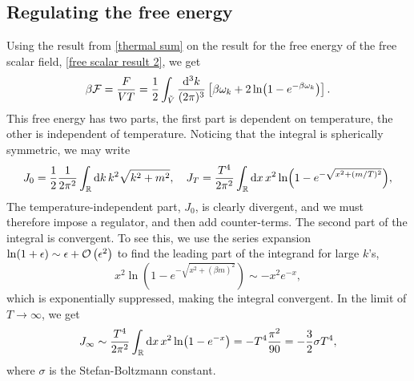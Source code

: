 \subsection{Regulating the free energy}
Using the result from \autoref{thermal sum} on the result for the free energy of the free scalar field, \autoref{free scalar result 2}, we get
\begin{equation}
    \label{free scalar free enrgy}
    \beta \mathcal{F} = \frac{F}{VT}
    = \frac{1}{2} \int_{\tilde V} \frac{\dd^3 k}{(2 \pi)^3}
    \left[
        \beta \omega_k + 2\ln(1 - e^{-\beta\omega_k})
    \right].
\end{equation}
This free energy has two parts, the first part is dependent on temperature, the other is independent of temperature.
Noticing that the integral is spherically symmetric, we may write
\begin{equation}
    J_0 = \frac{1}{2} \frac{1}{2 \pi^2}\int_{\mathbb{R}} \dd k \, k^2 \sqrt{k^2 + m^2}, \quad
    J_T = \frac{T^4}{2 \pi^2}\int_{\mathbb{R}} \dd x \, x^2  \ln(1 - e^{-\sqrt{x^2 + (m/T)^2}}), 
\end{equation}
The temperature-independent part, $J_0$, is clearly divergent, and we must therefore impose a regulator, and then add counter-terms.
The second part of the integral is convergent. 
To see this, we use the series expansion $\ln(1 + \epsilon) \sim \epsilon + \mathcal{O}\left(\epsilon^{2}\right)$ to find the leading part of the integrand for large $k$'s, 
\begin{equation}
    x^2 \ln(1 - e^{-\sqrt{x^2 + (\beta m)^2}}) \sim - x^2 e^{-x}, 
\end{equation}
which is exponentially suppressed, making the integral convergent.
In the limit of $T \rightarrow \infty$, we get
\begin{equation}
    J_\infty \sim \frac{T^4}{2 \pi^2} \int_{\mathbb{R}} \dd x \, x^2 \ln(1 - e^{-x})
    = - T^4 \frac{\pi^2}{90} = -\frac{3}{2} \sigma T^4,
\end{equation}
where $\sigma$ is the Stefan-Boltzmann constant. 

